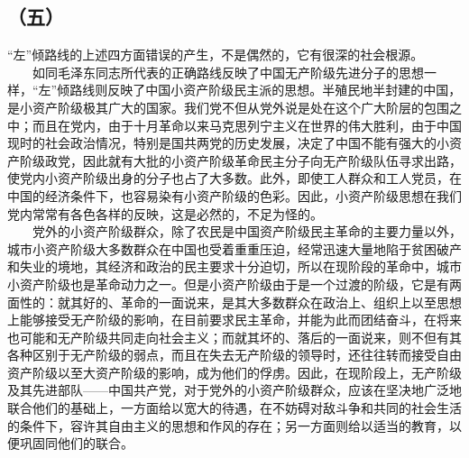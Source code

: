 \documentclass[cn,11pt,chinese]{elegantbook}
\def\myformat#1{\hfil\hfil #1}
\begin{document}
\subsection*{\myformat{（五）}}
“左”倾路线的上述四方面错误的产生，不是偶然的，它有很深的社会根源。\\
　　如同毛泽东同志所代表的正确路线反映了中国无产阶级先进分子的思想一样，“左”倾路线则反映了中国小资产阶级民主派的思想。半殖民地半封建的中国，是小资产阶级极其广大的国家。我们党不但从党外说是处在这个广大阶层的包围之中；而且在党内，由于十月革命以来马克思列宁主义在世界的伟大胜利，由于中国现时的社会政治情况，特别是国共两党的历史发展，决定了中国不能有强大的小资产阶级政党，因此就有大批的小资产阶级革命民主分子向无产阶级队伍寻求出路，使党内小资产阶级出身的分子也占了大多数。此外，即使工人群众和工人党员，在中国的经济条件下，也容易染有小资产阶级的色彩。因此，小资产阶级思想在我们党内常常有各色各样的反映，这是必然的，不足为怪的。\\
　　党外的小资产阶级群众，除了农民是中国资产阶级民主革命的主要力量以外，城市小资产阶级大多数群众在中国也受着重重压迫，经常迅速大量地陷于贫困破产和失业的境地，其经济和政治的民主要求十分迫切，所以在现阶段的革命中，城市小资产阶级也是革命动力之一。但是小资产阶级由于是一个过渡的阶级，它是有两面性的：就其好的、革命的一面说来，是其大多数群众在政治上、组织上以至思想上能够接受无产阶级的影响，在目前要求民主革命，并能为此而团结奋斗，在将来也可能和无产阶级共同走向社会主义；而就其坏的、落后的一面说来，则不但有其各种区别于无产阶级的弱点，而且在失去无产阶级的领导时，还往往转而接受自由资产阶级以至大资产阶级的影响，成为他们的俘虏。因此，在现阶段上，无产阶级及其先进部队——中国共产党，对于党外的小资产阶级群众，应该在坚决地广泛地联合他们的基础上，一方面给以宽大的待遇，在不妨碍对敌斗争和共同的社会生活的条件下，容许其自由主义的思想和作风的存在；另一方面则给以适当的教育，以便巩固同他们的联合。\\
\end{document}
